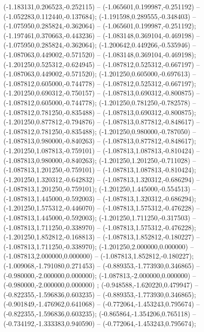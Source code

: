  (-1.183131,0.206523,-0.252115) -- (-1.065601,0.199987,-0.251192) -- (-1.052283,0.112440,-0.137684);
 (-1.191598,0.289555,-0.348403) -- (-1.075950,0.285824,-0.362064) -- (-1.065601,0.199987,-0.251192);
 (-1.197461,0.370663,-0.443236) -- (-1.083148,0.369104,-0.469198) -- (-1.075950,0.285824,-0.362064);
 (-1.200642,0.449266,-0.535946) -- (-1.087063,0.449002,-0.571520) -- (-1.083148,0.369104,-0.469198);
 (-1.201250,0.525312,-0.624945) -- (-1.087812,0.525312,-0.667197) -- (-1.087063,0.449002,-0.571520);
 (-1.201250,0.605000,-0.697613) -- (-1.087812,0.605000,-0.744778) -- (-1.087812,0.525312,-0.667197);
 (-1.201250,0.690312,-0.750157) -- (-1.087813,0.690312,-0.800875) -- (-1.087812,0.605000,-0.744778);
 (-1.201250,0.781250,-0.782578) -- (-1.087812,0.781250,-0.835488) -- (-1.087813,0.690312,-0.800875);
 (-1.201250,0.877812,-0.794876) -- (-1.087813,0.877812,-0.848617) -- (-1.087812,0.781250,-0.835488);
 (-1.201250,0.980000,-0.787050) -- (-1.087813,0.980000,-0.840263) -- (-1.087813,0.877812,-0.848617);
 (-1.201250,1.087813,-0.759101) -- (-1.087813,1.087813,-0.810424) -- (-1.087813,0.980000,-0.840263);
 (-1.201250,1.201250,-0.711028) -- (-1.087813,1.201250,-0.759101) -- (-1.087813,1.087813,-0.810424);
 (-1.201250,1.320312,-0.642832) -- (-1.087813,1.320312,-0.686294) -- (-1.087813,1.201250,-0.759101);
 (-1.201250,1.445000,-0.554513) -- (-1.087813,1.445000,-0.592003) -- (-1.087813,1.320312,-0.686294);
 (-1.201250,1.575312,-0.446070) -- (-1.087813,1.575312,-0.476228) -- (-1.087813,1.445000,-0.592003);
 (-1.201250,1.711250,-0.317503) -- (-1.087813,1.711250,-0.338970) -- (-1.087813,1.575312,-0.476228);
 (-1.201250,1.852812,-0.168813) -- (-1.087813,1.852812,-0.180227) -- (-1.087813,1.711250,-0.338970);
 (-1.201250,2.000000,0.000000) -- (-1.087813,2.000000,0.000000) -- (-1.087813,1.852812,-0.180227);
 (-1.009068,-1.791080,0.271453) -- (-0.889353,-1.773930,0.346865) -- (-0.980000,-2.000000,0.000000);
 (-1.087813,-2.000000,0.000000) -- (-0.980000,-2.000000,0.000000) ;
 (-0.948588,-1.620220,0.479947) -- (-0.822355,-1.596836,0.603235) -- (-0.889353,-1.773930,0.346865);
 (-0.901849,-1.476962,0.641068) -- (-0.772064,-1.453243,0.795674) -- (-0.822355,-1.596836,0.603235);
 (-0.865864,-1.354206,0.765118) -- (-0.734192,-1.333383,0.940590) -- (-0.772064,-1.453243,0.795674);
